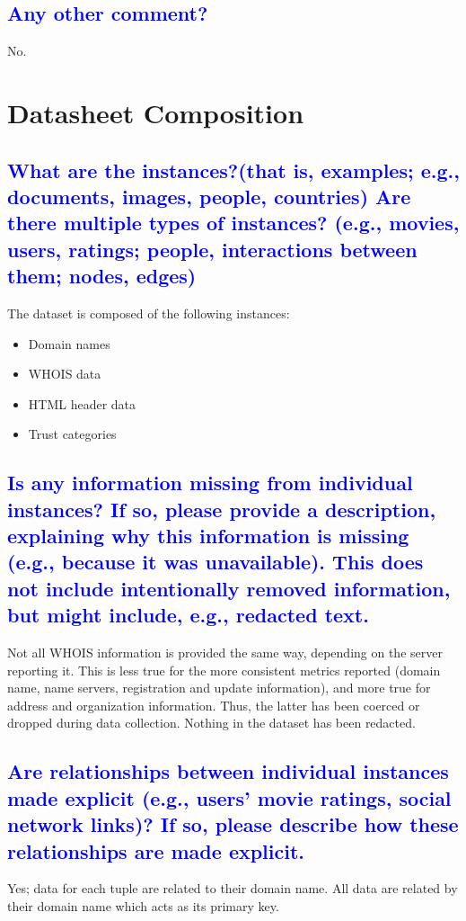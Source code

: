 \documentclass[letterpaper, 10 pt, conference]{ieeeconf}  %
\begin{document}
\textcolor{blue}{\subsection{Any other comment?}}

No.

\section{Datasheet Composition}

\textcolor{blue}{\subsection{What are the instances?(that is, examples; e.g., documents, images, people, countries) Are there multiple types
of instances? (e.g., movies, users, ratings; people, interactions between them; nodes, edges)}}

The dataset is composed of the following instances:
\begin{itemize}
\item Domain names
\item WHOIS data
\item HTML header data
\item Trust categories
\end{itemize}

\textcolor{blue}{\subsection{Is any information missing from individual instances? If so, please
provide a description, explaining why this information is missing (e.g., because it was unavailable). This does not include intentionally removed
information, but might include, e.g., redacted text.}}

Not all WHOIS information is provided the same way, depending on the server reporting it. This is less true for the more consistent metrics reported (domain name, name servers, registration and update information), and more true for address and organization information. Thus, the latter has been coerced or dropped during data collection. Nothing in the dataset has been redacted.

\textcolor{blue}{\subsection{Are relationships between individual instances made explicit (e.g.,
users’ movie ratings, social network links)? If so, please describe
how these relationships are made explicit.}}
Yes; data for each tuple are related to their domain name. All data are related by their domain name which acts as its primary key. 
\end{document}
